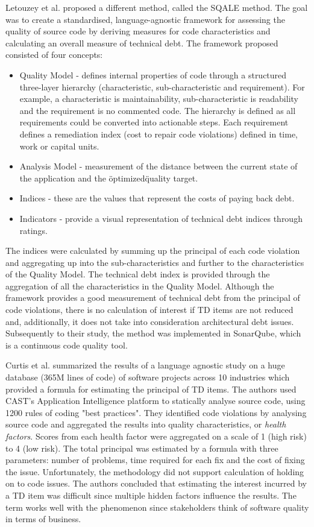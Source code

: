 \documentclass{mprop}
\begin{document}
Letouzey et al. \cite{Letouzey2012} proposed a different method, called the SQALE
method. The goal was to create a standardised, language-agnostic framework for
assessing the quality of source code by deriving measures for code
characteristics and calculating an overall measure of technical debt. The
framework proposed consisted of four concepts:
\begin{itemize}
	\item Quality Model - defines internal properties of code through a
	      structured three-layer hierarchy (characteristic, sub-characteristic and
	      requirement). For example, a characteristic is maintainability,
	      sub-characteristic is readability and the requirement is no commented
	      code. The hierarchy is defined as all requirements could be converted into
	      actionable steps. Each requirement defines a remediation index (cost to
	      repair code violations) defined in time, work or capital units.
	\item Analysis Model - measurement of the distance between the current
	      state of the application and the \"optimized\" quality target.
	\item Indices - these are the values that represent the costs of paying
	      back debt.
	\item Indicators - provide a visual representation of technical debt indices
	      through ratings.
\end{itemize}
The indices were calculated by summing up the principal of each code violation
and aggregating up into the sub-characteristics and further to the
characteristics of the Quality Model. The technical debt index is provided
through the aggregation of all the characteristics in the Quality Model.
Although the framework provides a good measurement of technical debt from the
principal of code violations, there is no calculation of interest if TD items
are not reduced and, additionally, it does not take into consideration
architectural debt issues. Subsequently to their study, the method was
implemented in SonarQube, which is a continuous code quality tool.

Curtis et al. \cite{Curtis2012} summarized the results of a language agnostic
study on a huge database (365M lines of code) of software projects across 10
industries which provided a formula for estimating the principal of TD items.
The authors used CAST's Application Intelligence platform to statically analyse
source code, using 1200 rules of coding "best practices". They identified code
violations by analysing source code and aggregated the results into quality
characteristics, or \textit{health factors}. Scores from each health factor were
aggregated on a scale of 1 (high risk) to 4 (low risk). The total principal was
estimated by a formula with three parameters: number of problems, time required
for each fix and the cost of fixing the issue. Unfortunately, the methodology
did not support calculation of holding on to code issues. The authors concluded
that estimating the interest incurred by a TD item was difficult since multiple
hidden factors influence the results. The term works well with the phenomenon
since stakeholders think of software quality in terms of business.
\end{document}
